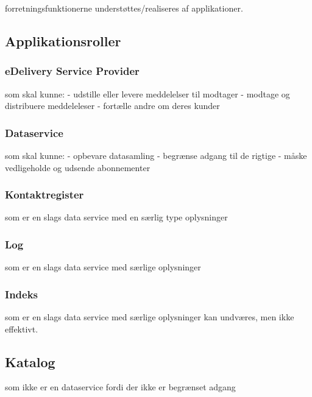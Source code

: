 forretningsfunktionerne understøttes/realiseres af applikationer.

\subsection{Applikationsroller}\label{applikationsroller}

\subsubsection{eDelivery Service
Provider}\label{edelivery-service-provider}

som skal kunne: - udstille eller levere meddelelser til modtager -
modtage og distribuere meddeleleser - fortælle andre om deres kunder

\subsubsection{Dataservice}\label{dataservice}

som skal kunne: - opbevare datasamling - begrænse adgang til de rigtige
- måske vedligeholde og udsende abonnementer

\subsubsection{Kontaktregister}\label{kontaktregister}

som er en slags data service med en særlig type oplysninger

\subsubsection{Log}\label{log}

som er en slags data service med særlige oplysninger

\subsubsection{Indeks}\label{indeks}

som er en slags data service med særlige oplysninger kan undværes, men
ikke effektivt.

\subsection{Katalog}\label{katalog}

som ikke er en dataservice fordi der ikke er begrænset adgang

